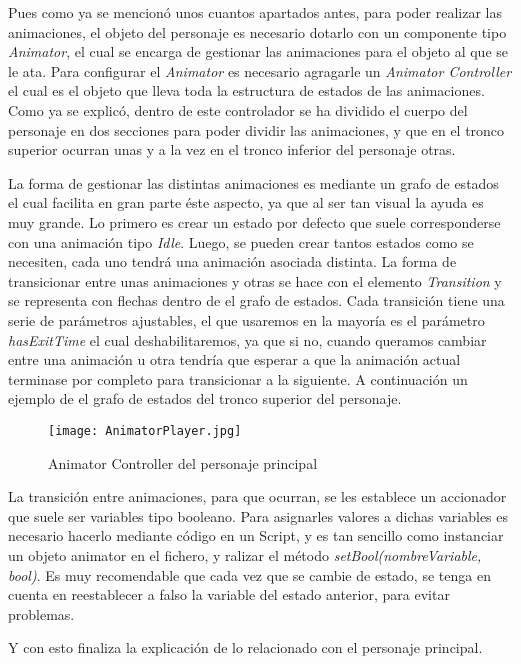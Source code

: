 Pues como ya se mencionó unos cuantos apartados antes, para poder realizar las animaciones, el objeto del personaje es necesario dotarlo con un componente tipo \textit{Animator}, el cual se encarga de gestionar las animaciones para el objeto al que se le ata. Para configurar el \textit{Animator} es necesario agragarle un \textit{Animator Controller} el cual es el objeto que lleva toda la estructura de estados de las animaciones. Como ya se explicó, dentro de este controlador se ha dividido el cuerpo del personaje en dos secciones para poder dividir las animaciones, y que en el tronco superior ocurran unas y a la vez en el tronco inferior del personaje otras.

La forma de gestionar las distintas animaciones es mediante un grafo de estados el cual facilita en gran parte éste aspecto, ya que al ser tan visual la ayuda es muy grande. Lo primero es crear un estado por defecto que suele corresponderse con una animación tipo \textit{Idle}. Luego, se pueden crear tantos estados como se necesiten, cada uno tendrá una animación asociada distinta. La forma de transicionar entre unas animaciones y otras se hace con el elemento \textit{Transition} y se representa con flechas dentro de el grafo de estados. Cada transición tiene una serie de parámetros ajustables, el que usaremos en la mayoría es el parámetro \textit{hasExitTime} el cual deshabilitaremos, ya que si no, cuando queramos cambiar entre una animación u otra tendría que esperar a que la animación actual terminase por completo para transicionar a la siguiente. A continuación un ejemplo de el grafo de estados del tronco superior del personaje.

\begin{figure}[H]
    \centering
    \texttt{[image: AnimatorPlayer.jpg]}
    \caption{Animator Controller del personaje principal}
\end{figure}

La transición entre animaciones, para que ocurran, se les establece un accionador que suele ser variables tipo booleano. Para asignarles valores a dichas variables es necesario hacerlo mediante código en un Script, y es tan sencillo como instanciar un objeto animator en el fichero, y ralizar el método \textit{setBool(nombreVariable, bool)}. Es muy recomendable que cada vez que se cambie de estado, se tenga en cuenta en reestablecer a falso la variable del estado anterior, para evitar problemas.

Y con esto finaliza la explicación de lo relacionado con el personaje principal. 

